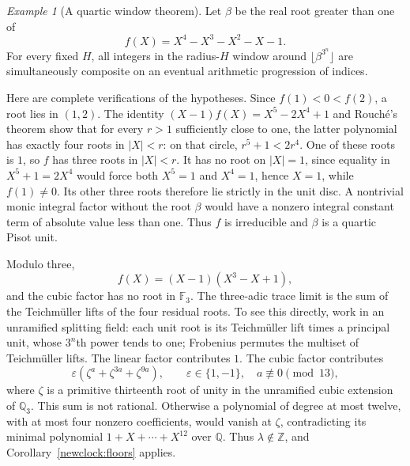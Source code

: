 \documentclass[11pt,a4paper]{article}
\theoremstyle{definition}\newtheorem{definition}[theorem]{Definition}
\theoremstyle{remark}\newtheorem{remark}[theorem]{Remark}
\newtheorem{example}[theorem]{Example}
\begin{document}
\begin{example}[A quartic window theorem]
\label{newclock:tetranacci}
Let $\beta$ be the real root greater than one of
\[
 f(X)=X^4-X^3-X^2-X-1.
\]
For every fixed $H$, all integers in the radius-$H$ window
around $\lfloor\beta^{3^n}\rfloor$ are simultaneously
composite on an eventual arithmetic progression of indices.

Here are complete verifications of the hypotheses.  Since
$f(1)<0<f(2)$, a root lies in $(1,2)$.  The identity
$(X-1)f(X)=X^5-2X^4+1$ and Rouch\'e's theorem show that
for every $r>1$ sufficiently close to one, the latter polynomial
has exactly four roots in $|X|<r$: on that circle,
$r^5+1<2r^4$.  One of these roots is $1$, so $f$ has
three roots in $|X|<r$.  It has no root on $|X|=1$,
since equality in $X^5+1=2X^4$ would force both
$X^5=1$ and $X^4=1$, hence $X=1$, while $f(1)\ne0$.
Its other three roots therefore lie strictly in the unit
disc.  A nontrivial monic integral factor without the root
$\beta$ would have a nonzero integral constant term of
absolute value less than one.  Thus $f$ is irreducible and
$\beta$ is a quartic Pisot unit.

Modulo three,
\[
 f(X)=(X-1)(X^3-X+1),
\]
and the cubic factor has no root in $\mathbb F_3$.
The three-adic trace limit is the sum of the Teichm\"uller
lifts of the four residual roots.  To see this directly,
work in an unramified splitting field: each unit root is
its Teichm\"uller lift times a principal unit, whose
$3^n$th power tends to one; Frobenius permutes the
multiset of Teichm\"uller lifts.  The linear factor
contributes $1$.  The cubic factor contributes
\[
 \varepsilon(\zeta^a+\zeta^{3a}+\zeta^{9a}),
 \qquad\varepsilon\in\{1,-1\},\quad
 a\not\equiv0\pmod{13},
\]
where $\zeta$ is a primitive thirteenth root of unity in
the unramified cubic extension of $\mathbb Q_3$.
This sum is not rational.  Otherwise a polynomial of
degree at most twelve, with at most four nonzero
coefficients, would vanish at $\zeta$, contradicting
its minimal polynomial $1+X+\cdots+X^{12}$ over
$\mathbb Q$.  Thus $\lambda\notin\mathbb Z$, and
Corollary~\ref{newclock:floors} applies.
\end{example}
\end{document}
